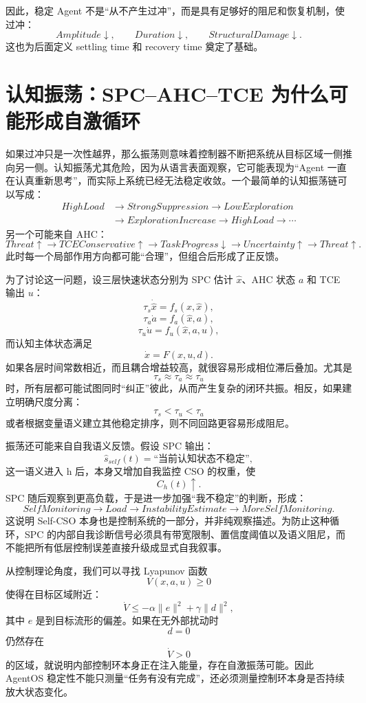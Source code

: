 因此，稳定 Agent 不是“从不产生过冲”，而是具有足够好的阻尼和恢复机制，使过冲：
\[
Amplitude\downarrow,
\qquad
Duration\downarrow,
\qquad
StructuralDamage\downarrow.
\]
这也为后面定义 settling time 和 recovery time 奠定了基础。

\section{认知振荡：SPC--AHC--TCE 为什么可能形成自激循环}

如果过冲只是一次性越界，那么振荡则意味着控制器不断把系统从目标区域一侧推向另一侧。认知振荡尤其危险，因为从语言表面观察，它可能表现为“Agent 一直在认真重新思考”，而实际上系统已经无法稳定收敛。一个最简单的认知振荡链可以写成：
\[
\begin{aligned}
HighLoad&\rightarrow StrongSuppression\rightarrow LowExploration\\
&\rightarrow ExplorationIncrease\rightarrow HighLoad\rightarrow\cdots
\end{aligned}
\]
另一个可能来自 AHC：
\[
Threat\uparrow
\rightarrow
TCEConservative\uparrow
\rightarrow
TaskProgress\downarrow
\rightarrow
Uncertainty\uparrow
\rightarrow
Threat\uparrow.
\]
此时每一个局部作用方向都可能“合理”，但组合后形成了正反馈。

为了讨论这一问题，设三层快速状态分别为 SPC 估计 $\hat{x}$、AHC 状态 $a$ 和 TCE 输出 $u$：
\[
\tau_s\dot{\hat{x}}
=
f_s(x,\hat{x}),
\]
\[
\tau_a\dot{a}
=
f_a(\hat{x},a),
\]
\[
\tau_u\dot{u}
=
f_u(\hat{x},a,u),
\]
而认知主体状态满足
\[
\dot{x}
=
F(x,u,d).
\]
如果各层时间常数相近，而且耦合增益较高，就很容易形成相位滞后叠加。尤其是
\[
\tau_s
\approx
\tau_a
\approx
\tau_u
\]
时，所有层都可能试图同时“纠正”彼此，从而产生复杂的闭环共振。相反，如果建立明确尺度分离：
\[
\tau_s
<
\tau_u
<
\tau_a
\]
或者根据变量语义建立其他稳定排序，则不同回路更容易形成阻尼。

振荡还可能来自自我语义反馈。假设 SPC 输出：
\[
\hat{s}_{self}(t)
=
\text{``当前认知状态不稳定''},
\]
这一语义进入 h 后，本身又增加自我监控 CSO 的权重，使
\[
C_h(t)\uparrow.
\]
SPC 随后观察到更高负载，于是进一步加强“我不稳定”的判断，形成：
\[
SelfMonitoring
\rightarrow
Load
\rightarrow
InstabilityEstimate
\rightarrow
MoreSelfMonitoring.
\]
这说明 Self-CSO 本身也是控制系统的一部分，并非纯观察描述。为防止这种循环，SPC 的内部自我诊断信号必须具有带宽限制、置信度阈值以及语义阻尼，而不能把所有低层控制误差直接升级成显式自我叙事。

从控制理论角度，我们可以寻找 Lyapunov 函数
\[
V(x,a,u)
\ge0
\]
使得在目标区域附近：
\[
\dot V
\le
-\alpha \|e\|^2
+
\gamma \|d\|^2,
\]
其中 $e$ 是到目标流形的偏差。如果在无外部扰动时
\[
d=0
\]
仍然存在
\[
\dot V>0
\]
的区域，就说明内部控制环本身正在注入能量，存在自激振荡可能。因此 AgentOS 稳定性不能只测量“任务有没有完成”，还必须测量控制环本身是否持续放大状态变化。

